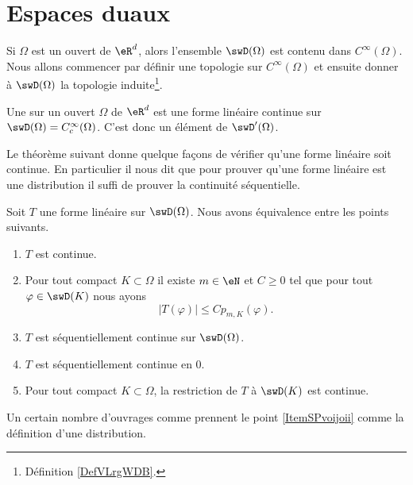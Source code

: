 \section{Espaces duaux}

Si \( \Omega\) est un ouvert de \( \eR^d\), alors l'ensemble \( \swD(\Omega)\) est contenu dans \(  C^{\infty}(\Omega)\). Nous allons commencer par définir une topologie sur \(  C^{\infty}(\Omega)\) et ensuite donner à \( \swD(\Omega)\) la topologie induite\footnote{Définition \ref{DefVLrgWDB}.}.

\begin{definition}[Distribution]    \label{DefPZDtWVP}
    Une  sur un ouvert \( \Omega\) de \( \eR^d\) est une forme linéaire continue sur \(\swD(\Omega)= C^{\infty}_c(\Omega)\). C'est donc un élément de \( \swD'(\Omega)\).
\end{definition}

Le théorème suivant donne quelque façons de vérifier qu'une forme linéaire soit continue. En particulier il nous dit que pour prouver qu'une forme linéaire est une distribution il suffi de prouver la continuité séquentielle.
\begin{theorem} \label{ThoVDDBnVn}
    Soit \( T\) une forme linéaire sur \( \swD(\Omega)\). Nous avons équivalence entre les points suivants.
    \begin{enumerate}
        \item
            \( T\) est continue.
        \item   \label{ItemSPvoijoii}
            Pour tout compact \( K\subset \Omega\) il existe \( m\in \eN\) et \( C\geq 0\) tel que pour tout \( \varphi\in\swD(K)\) nous ayons
            \begin{equation}
                \big| T(\varphi) \big|\leq C p_{m,K}(\varphi).
            \end{equation}
        \item
            \( T\) est séquentiellement continue sur \( \swD(\Omega)\).
        \item
            \( T\) est séquentiellement continue en \( 0\).
        \item
            Pour tout compact \( K\subset \Omega\), la restriction de \( T\) à \( \swD(K)\) est continue.
    \end{enumerate}
\end{theorem}
Un certain nombre d'ouvrages comme \cite{WTefHHs} prennent le point \ref{ItemSPvoijoii} comme la définition d'une distribution.

